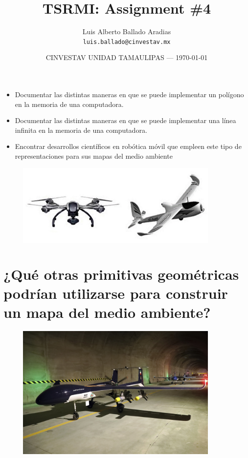 \documentclass{article}
\title{TSRMI: Assignment \#4} %
\author{Luis Alberto Ballado Aradias\\ \texttt{luis.ballado@cinvestav.mx}} %
\date{CINVESTAV UNIDAD TAMAULIPAS --- \today} %
\begin{document}
\maketitle %


\begin{itemize}
\item Documentar las distintas maneras en que se puede implementar un polígono en la memoria de una computadora.
\item Documentar las distintas maneras en que se puede implementar una línea infinita en la memoria de una computadora.
\item{Encontrar desarrollos científicos en robótica móvil que empleen este tipo de representaciones para sus mapas del medio ambiente}
\end{itemize}


\begin{figure}[h]
\includegraphics[width=10cm]{images/vant.jpg}
\centering
\end{figure}

\newpage
\section{¿Qué otras primitivas geométricas podrían utilizarse para construir un mapa del medio ambiente?}

\begin{figure}[h]
\includegraphics[width=10cm]{images/drone_alafija.jpg}
\centering
\end{figure}
\end{document}
